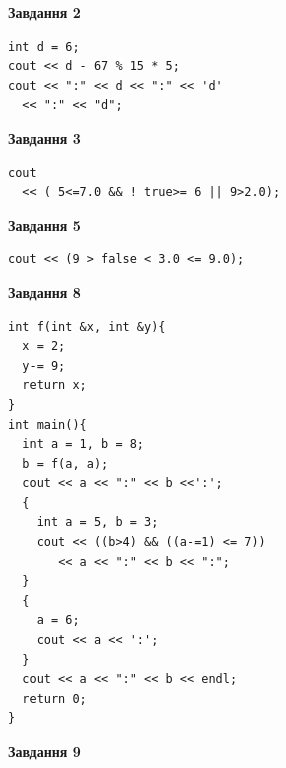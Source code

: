 \documentclass[12pt, ukrainian]{article}
\begin{document}
{\begin {large}
\begin{minipage}[t]{7.0cm}
\end{minipage}
\vline \hspace{1mm}
\begin{minipage}[t]{11.0cm}

\begin{center}
\textbf{Завдання 2}
\end{center}
\vspace{-8mm}

\begin{verbatim}
int d = 6;
cout << d - 67 % 15 * 5;
cout << ":" << d << ":" << 'd' 
  << ":" << "d";
\end{verbatim}



\begin{center}
\textbf{Завдання 3}
\end{center}
\vspace{-8mm}

\begin{verbatim}
cout 
  << ( 5<=7.0 && ! true>= 6 || 9>2.0);
\end{verbatim}



\begin{center}
\textbf{Завдання 5}
\end{center}
\vspace{-8mm}

\begin{verbatim}
cout << (9 > false < 3.0 <= 9.0);
\end{verbatim}



\begin{center}
\textbf{Завдання 8}
\end{center}
\vspace{-8mm}

\begin{verbatim}
int f(int &x, int &y){
  x = 2;
  y-= 9;
  return x;
}
int main(){
  int a = 1, b = 8;
  b = f(a, a);
  cout << a << ":" << b <<':';
  {
    int a = 5, b = 3;
    cout << ((b>4) && ((a-=1) <= 7))
       << a << ":" << b << ":";
  }
  {
    a = 6;
    cout << a << ':';
  }
  cout << a << ":" << b << endl;
  return 0;
}
\end{verbatim}

\end{minipage}


\begin{minipage}[t]{7.0cm}

\begin{center}
\textbf{Завдання 9}
\end{center}
\vspace{-8mm}


\end{minipage}
\end{large}}
\end{document}

